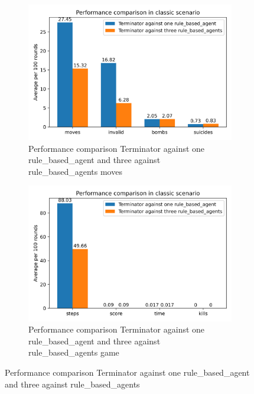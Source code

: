 \documentclass[
	letterpaper, %
	12pt, %
]{CSUniSchoolLabReport}
\begin{document}
\begin{figure}[H]

\begin{subfigure}{\textwidth}
	\centering
	\includegraphics[scale=0.6]{Figures/Task4-1.png}
	\caption{Performance comparison Terminator against one rule\_based\_agent and three against rule\_based\_agents moves}
	\label{img:Task4-1}
\end{subfigure}

\begin{subfigure}{\textwidth}
	\centering
	\includegraphics[scale=0.6]{Figures/Task4-2.png}
	\caption{Performance comparison Terminator against one rule\_based\_agent and three against rule\_based\_agents game}
	\label{img:Task4-2}
\end{subfigure}

\caption{Performance comparison Terminator against one rule\_based\_agent and three against rule\_based\_agents}
\label{img:Task4}

\end{figure}
\end{document}
